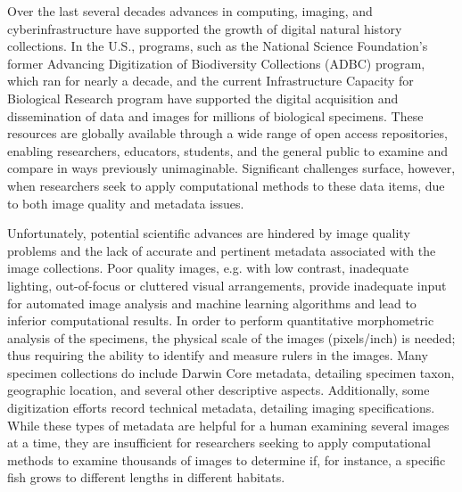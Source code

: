 \documentclass[screen,review]{acmart}
\begin{document}
Over the last several decades advances in computing, imaging, and
cyberinfrastructure have supported the growth of digital natural history collections. In the U.S., programs, such as the National Science Foundation’s former Advancing Digitization of Biodiversity Collections (ADBC) program, which ran for
nearly a decade, and the current Infrastructure Capacity for Biological Research program have supported the digital acquisition and dissemination of data and images for millions of biological specimens. These resources are globally available through a wide range of open access repositories, enabling researchers, educators, students, and the general public to examine and compare in ways previously unimaginable. Significant challenges surface, however, when researchers seek to apply computational methods to these data items,
due to both image quality and metadata issues.

Unfortunately, potential scientific advances are hindered by image quality
problems and the lack of accurate and pertinent metadata
associated with the image collections.
Poor quality images, e.g. with low contrast, inadequate lighting,
out-of-focus or cluttered visual arrangements, provide inadequate input
for automated
image analysis and machine learning algorithms and lead to inferior
computational results.
In order to perform quantitative morphometric analysis of the specimens,
the physical scale of the images (pixels/inch) is needed; thus
requiring the ability to identify and measure rulers in the images.
Many specimen collections do include Darwin Core metadata, detailing
specimen taxon, geographic location, and several other descriptive aspects.
Additionally, some digitization efforts record technical metadata, detailing imaging specifications. While these types of metadata are helpful for a
human examining several images at a time, they are insufficient for researchers seeking to apply computational methods to examine thousands of images
to determine if, for instance, a specific fish grows to different lengths
in different habitats.
\end{document}
